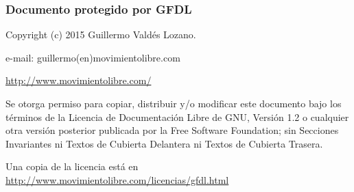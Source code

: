 %
%
%

\begin{frame}

  \frametitle{Documento protegido por GFDL}

  \begin{scriptsize}
    Copyright (c) 2015 Guillermo Valdés Lozano.\par
    e-mail: guillermo(en)movimientolibre.com\par
    \url{http://www.movimientolibre.com/}\par
    \vspace{0.3cm}

    Se otorga permiso para copiar, distribuir y/o modificar este documento bajo los términos de la Licencia de Documentación Libre de GNU, Versión 1.2 o cualquier otra versión posterior publicada por la Free Software Foundation; sin Secciones Invariantes ni Textos de Cubierta Delantera ni Textos de Cubierta Trasera.\par
    \vspace{0.3cm}

    Una copia de la licencia está en \url{http://www.movimientolibre.com/licencias/gfdl.html}\par
  \end{scriptsize}

\end{frame}
